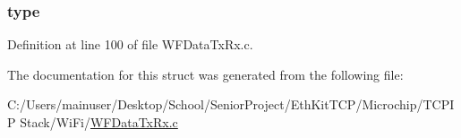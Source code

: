 \subsubsection[{type}]{ type}\label{structrx_data_preamble_struct_a631bceb766461ab7475c7ed56717aac8}


Definition at line 100 of file W\+F\+Data\+Tx\+Rx.\+c.



The documentation for this struct was generated from the following file\+:\begin{DoxyCompactItemize}
\item 
C\+:/\+Users/mainuser/\+Desktop/\+School/\+Senior\+Project/\+Eth\+Kit\+T\+C\+P/\+Microchip/\+T\+C\+P\+I\+P Stack/\+Wi\+Fi/\hyperlink{_w_f_data_tx_rx_8c}{W\+F\+Data\+Tx\+Rx.\+c}\end{DoxyCompactItemize}
